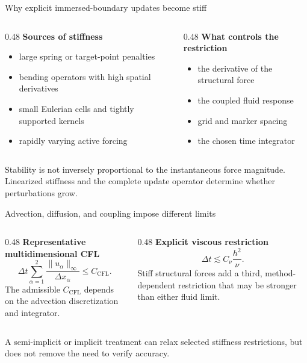 \documentclass[aspectratio=169,11pt]{beamer}
\begin{document}
\begin{frame}{Why explicit immersed-boundary updates become stiff}
\begin{columns}[T,onlytextwidth]
\begin{column}{0.48\textwidth}
\textbf{Sources of stiffness}
\begin{itemize}\itemsep6pt
  \item large spring or target-point penalties
  \item bending operators with high spatial derivatives
  \item small Eulerian cells and tightly supported kernels
  \item rapidly varying active forcing
\end{itemize}
\end{column}
\begin{column}{0.48\textwidth}
\textbf{What controls the restriction}
\begin{itemize}\itemsep6pt
  \item the derivative of the structural force
  \item the coupled fluid response
  \item grid and marker spacing
  \item the chosen time integrator
\end{itemize}
\end{column}
\end{columns}
\begin{punchbox}
\small Stability is not inversely proportional to the instantaneous force magnitude. Linearized stiffness and the complete update operator determine whether perturbations grow.
\end{punchbox}
\end{frame}

\begin{frame}{Advection, diffusion, and coupling impose different limits}
\begin{columns}[T,onlytextwidth]
\begin{column}{0.48\textwidth}
\textbf{Representative multidimensional CFL}
\[
  \Delta t
  \sum_{\alpha=1}^{2}
  \frac{\lVert u_\alpha\rVert_\infty}{\Delta x_\alpha}
  \le C_{\mathrm{CFL}}.
\]
\small The admissible \(C_{\mathrm{CFL}}\) depends on the advection discretization and integrator.
\end{column}
\begin{column}{0.48\textwidth}
\textbf{Explicit viscous restriction}
\[
  \Delta t
  \lesssim
  C_\nu\frac{h^2}{\nu}.
\]
\small Stiff structural forces add a third, method-dependent restriction that may be stronger than either fluid limit.
\end{column}
\end{columns}
\begin{punchbox}
\small A semi-implicit or implicit treatment can relax selected stiffness restrictions, but does not remove the need to verify accuracy.
\end{punchbox}
\end{frame}
\end{document}

